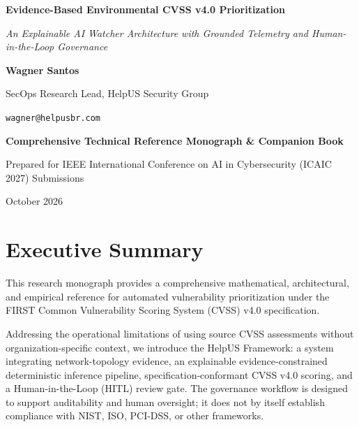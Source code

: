 \documentclass[11pt,a4paper,oneside]{book}
\begin{document}
\begin{titlepage}
    \centering
    \vspace*{2cm}
    
    {\Huge\bfseries\color{darknavy} Evidence-Based Environmental CVSS v4.0 Prioritization\par}
    \vspace{0.8cm}
    {\Large\itshape An Explainable AI Watcher Architecture with Grounded Telemetry and Human-in-the-Loop Governance\par}
    
    \vspace{2.5cm}
    {\large\bfseries Wagner Santos\par}
    \vspace{0.2cm}
    {\normalsize SecOps Research Lead, HelpUS Security Group\par}
    {\normalsize \texttt{wagner@helpusbr.com}\par}
    
    \vfill
    {\large\bfseries Comprehensive Technical Reference Monograph \& Companion Book\par}
    \vspace{0.4cm}
    {\small Prepared for IEEE International Conference on AI in Cybersecurity (ICAIC 2027) Submissions\par}
    \vspace{0.8cm}
    {\normalsize October 2026\par}
\end{titlepage}

\frontmatter

\tableofcontents
\listoffigures
\listoftables

\chapter{Executive Summary}
This research monograph provides a comprehensive mathematical, architectural, and empirical reference for automated vulnerability prioritization under the FIRST Common Vulnerability Scoring System (CVSS) v4.0 specification. 

Addressing the operational limitations of using source CVSS assessments without organization-specific context, we introduce the HelpUS Framework: a system integrating network-topology evidence, an explainable evidence-constrained deterministic inference pipeline, specification-conformant CVSS v4.0 scoring, and a Human-in-the-Loop (HITL) review gate. The governance workflow is designed to support auditability and human oversight; it does not by itself establish compliance with NIST, ISO, PCI-DSS, or other frameworks. 
\end{document}
